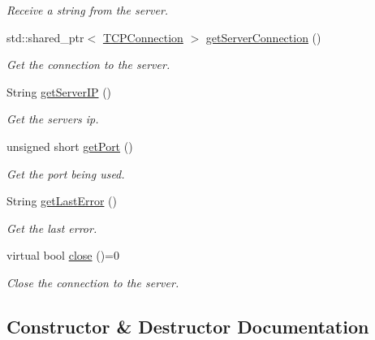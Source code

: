 \begin{DoxyCompactItemize}
\begin{DoxyCompactList}\small\item\em Receive a string from the server. \end{DoxyCompactList}\item 
std\+::shared\+\_\+ptr$<$ \hyperlink{class_rad_jav_1_1_networking_1_1_t_c_p_connection}{T\+C\+P\+Connection} $>$ \hyperlink{class_rad_jav_1_1_networking_1_1_tcpip_client_add530166ec4e24a631ebb800069629ed}{get\+Server\+Connection} ()
\begin{DoxyCompactList}\small\item\em Get the connection to the server. \end{DoxyCompactList}\item 
String \hyperlink{class_rad_jav_1_1_networking_1_1_tcpip_client_a3a9e7b97eb5bf3d4476277a2ddb29262}{get\+Server\+IP} ()
\begin{DoxyCompactList}\small\item\em Get the server\textquotesingle{}s ip. \end{DoxyCompactList}\item 
unsigned short \hyperlink{class_rad_jav_1_1_networking_1_1_tcpip_client_aa7d3728465e7fe2baae9b5e76b9aee46}{get\+Port} ()
\begin{DoxyCompactList}\small\item\em Get the port being used. \end{DoxyCompactList}\item 
String \hyperlink{class_rad_jav_1_1_networking_1_1_tcpip_client_aca54358a21d0a3f24747739b2ca89c12}{get\+Last\+Error} ()
\begin{DoxyCompactList}\small\item\em Get the last error. \end{DoxyCompactList}\item 
virtual bool \hyperlink{class_rad_jav_1_1_networking_1_1_tcpip_client_a16389ef70dd3af178e95efd26a4b269e}{close} ()=0
\begin{DoxyCompactList}\small\item\em Close the connection to the server. \end{DoxyCompactList}\end{DoxyCompactItemize}


\subsection{Constructor \& Destructor Documentation}

